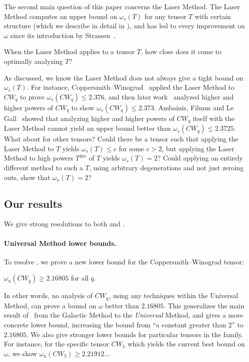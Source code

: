 \documentclass{toc}
\begin{document}
The second main question of this paper concerns the Laser Method. 
The Laser Method
%
computes an upper bound on  %
$\omega_s(T)$ for any tensor $T$ with certain structure (which we describe in detail in ), and has led to every improvement on $\omega$ since its introduction by Strassen~\cite{strassenlaser1}.
\begin{question}\label{q2}
When the Laser Method applies to a tensor $T$, how close does it come to optimally analyzing $T$?
\end{question}
As discussed, we know the Laser Method does not always give a tight bound on $\omega_s(T)$. For instance, Coppersmith--Winograd~\cite{coppersmith} applied the Laser Method to $CW_q$ to prove $\omega_s(CW_q) \leq 2.376$, and then 
%
later work~\cite{stothers,v12,legall,awrefined}
analyzed higher and higher powers of $CW_q$ to show $\omega_s(CW_q) \leq 2.373$. Ambainis, Filmus and Le Gall~\cite{ambainis} showed that analyzing higher and higher powers of $CW_q$ itself with the Laser Method cannot yield an upper bound better than $\omega_s(CW_q) \leq 2.3725$. What about for other tensors? Could there be a tensor such that applying the Laser Method to $T$ yields $\omega_s(T) \leq c$ for some $c > 2$, but applying the Laser Method to high powers $T^{\otimes n}$ of $T$ yields $\omega_s(T) = 2$? Could applying an entirely different method to such a $T$, using arbitrary degenerations and not just zeroing outs, show that $\omega_u(T) = 2$?

%
\subsection{Our results}

We give strong resolutions to both  and .

%
\paragraph{Universal Method lower bounds.}
To resolve , we prove a new lower bound for the Coppersmith--Winograd tensor:

\begin{theorem} \label{mainthm}
$\omega_u(CW_q) \geq 2.16805$ for all $q$.
\end{theorem}

In other words, no analysis of $CW_q$, using any techniques within the Universal Method, can prove a bound on $\omega$ better than $2.16805$. This generalizes the main result of~\cite{aw} from the Galactic Method to the \emph{Universal} Method, and gives a more concrete lower bound, increasing the bound from ``a constant greater than $2$'' to $2.16805$. We also give stronger lower bounds for particular tensors in the family. For instance, for the specific tensor $CW_5$ which yields the current best bound on $\omega$, we show $\omega_u(CW_5) \geq 2.21912...$
\end{document}
